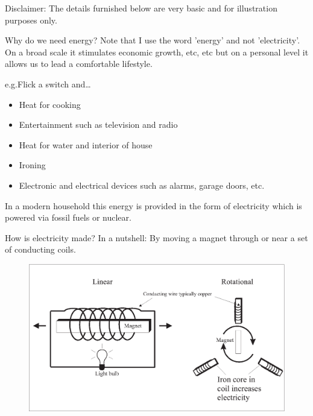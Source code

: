 
Disclaimer: The details furnished below are very basic and for
illustration purposes only.

Why do we need energy? Note that I use the word 'energy' and not
'electricity'. On a broad scale it stimulates economic growth, etc,
etc but on a personal level it allows us to lead a comfortable
lifestyle.

e.g.\@ Flick a switch and… 
\begin{itemize}
\item Heat for cooking 
\item Entertainment such as television and radio 
\item Heat for water and interior of house 
\item Ironing
\item Electronic and electrical devices such as alarms, garage doors, etc.
\end{itemize}

In a modern household this energy is provided in the form of electricity which is powered via fossil fuels or nuclear.

How is electricity made? In a nutshell: By moving a magnet through or near a set of conducting coils.

\begin{figure}[H]
\centering
\includegraphics[scale=0.4]{../../epsimages/1ElectricityGeneration.eps}
\end{figure}

